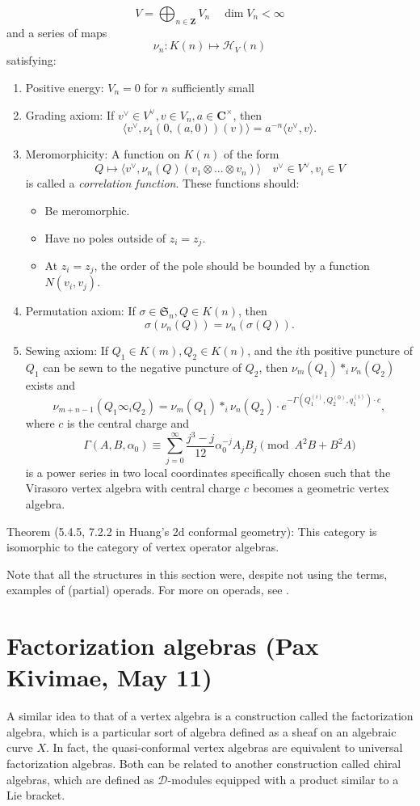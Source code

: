 \documentclass{article}
\newcommand{\CC}{\mathbold{C}}
\newcommand{\ZZ}{\mathbold{Z}}
\newcommand{\Hh}{\mathcal{H}}
\newcommand{\Dd}{\mathcal{D}}
\newcommand{\Sym}{\mathfrak{S}}
\begin{document}
\[V = \bigoplus_{n \in \ZZ} V_n \quad \dim V_n < \infty \]
and a series of maps
\[\nu_n: K(n) \mapsto \Hh_V(n) \]
satisfying:
\begin{enumerate}
\item Positive energy: $V_n=0$ for $n$ sufficiently small
\item Grading axiom: If $v^\vee \in V^\vee, v \in V_n, a \in \CC^\times$, then
  \[\langle v^\vee,\nu_1(0,(a,0))(v)\rangle = a^{-n}\langle v^\vee,v \rangle. \]
\item Meromorphicity: A function on $K(n)$ of the form
  \[Q \mapsto \langle v^\vee, \nu_n(Q)(v_1 \otimes ... \otimes v_n) \rangle \quad v^\vee \in V^\vee, v_i \in V \]
  is called a \textit{correlation function}.  These functions should:
  \begin{itemize}
  \item Be meromorphic.
  \item Have no poles outside of $z_i=z_j$.
  \item At $z_i=z_j$, the order of the pole should be bounded by a function $N(v_i,v_j)$.
  \end{itemize}
\item Permutation axiom: If $\sigma \in \Sym_n, Q \in K(n)$, then
\[\sigma(\nu_n(Q))=\nu_n(\sigma(Q)). \]
\item Sewing axiom: If $Q_1 \in K(m), Q_2 \in K(n)$, and the $i$th positive puncture of $Q_1$ can be sewn to the negative puncture of $Q_2$, then $\nu_m(Q_1) *_i \nu_n(Q_2)$ exists and
\[\nu_{m+n-1}(Q_1 \infty_i Q_2) = \nu_m(Q_1) *_i \nu_n(Q_2) \cdot e^{-\Gamma(Q_1^{(i)},Q_2^{(0)},q_1^{(i)}) \cdot c}, \]
where $c$ is the central charge and
\[\Gamma(A,B,\alpha_0) \equiv \sum_{j=0}^\infty\frac{j^3-j}{12}\alpha_0^{-j}A_jB_j \pmod{A^2B+B^2A} \]
is a power series in two local coordinates specifically chosen such that the Virasoro vertex algebra with central charge $c$ becomes a geometric vertex algebra.
\end{enumerate}
Theorem (5.4.5, 7.2.2 in Huang's 2d conformal geometry): This category is isomorphic to the category of vertex operator algebras.

Note that all the structures in this section were, despite not using the terms, examples of (partial) operads. For more on operads, see \cite{MR1898414}.
\section{Factorization algebras (Pax Kivimae, May 11)}
A similar idea to that of a vertex algebra is a construction called the factorization algebra, which is a particular sort of algebra defined as a sheaf on an algebraic curve $X$.  In fact, the quasi-conformal vertex algebras are equivalent to universal factorization algebras.  Both can be related to another construction called chiral algebras, which are defined as $\Dd$-modules equipped with a product similar to a Lie bracket.
\end{document}
